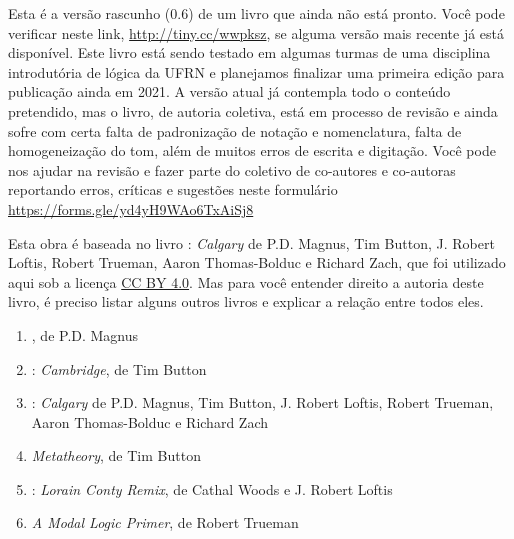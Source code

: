 \parbox{3 in}{
Esta é a versão rascunho (0.6) de um livro que ainda não está pronto.
Você pode verificar neste link, \hbox{\url{http://tiny.cc/wwpksz}}, se alguma versão mais recente já está disponível.
Este livro está sendo testado em algumas turmas de uma disciplina introdutória de lógica da UFRN e planejamos finalizar uma primeira edição para publicação ainda em 2021. 
A versão atual já contempla todo o conteúdo pretendido, mas o livro, de autoria coletiva, está em processo de revisão e ainda sofre com certa falta de padronização de notação e nomenclatura, falta de homogeneização do tom, além de muitos erros de escrita e digitação.
Você pode nos ajudar na revisão e fazer parte do coletivo de co-autores e co-autoras reportando erros, críticas e sugestões neste formulário
\hbox{\url{https://forms.gle/yd4yH9WAo6TxAiSj8}} 
}

\newpage

\noindent Esta obra é baseada no livro \forallx: \textit{Calgary} de P.D. Magnus, Tim Button, J. Robert Loftis, Robert Trueman, Aaron Thomas-Bolduc e Richard Zach, que foi utilizado aqui sob a licença \href{https://creativecommons.org/licenses/by/4.0/}{CC BY 4.0}.
Mas para você entender direito a autoria deste livro, é preciso listar alguns outros livros e explicar a relação entre todos eles.

\begin{enumerate}
   \item \forallx, de P.D. Magnus

   \item \forallx: \textit{Cambridge}, de Tim Button

   \item \forallx: \textit{Calgary} de P.D. Magnus, Tim Button, J. Robert Loftis, Robert Trueman, Aaron Thomas-Bolduc e Richard Zach
   
   \item \textit{Metatheory}, de Tim Button
   
   \item  \forallx: \textit{Lorain Conty Remix}, de Cathal Woods e J. Robert Loftis
   
   \item \textit{A Modal Logic Primer}, de Robert Trueman
\end{enumerate}

